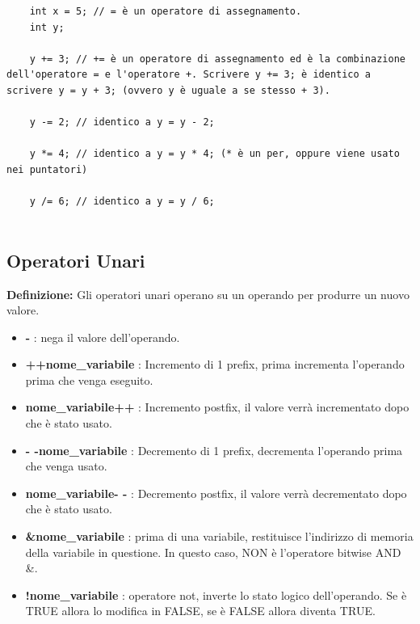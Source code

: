 \begin{lstlisting}
	int x = 5; // = è un operatore di assegnamento.
	int y;
	
	y += 3; // += è un operatore di assegnamento ed è la combinazione dell'operatore = e l'operatore +. Scrivere y += 3; è identico a scrivere y = y + 3; (ovvero y è uguale a se stesso + 3).
	
	y -= 2; // identico a y = y - 2;
	
	y *= 4; // identico a y = y * 4; (* è un per, oppure viene usato nei puntatori)
	
	y /= 6; // identico a y = y / 6;
	
\end{lstlisting}

\subsection{Operatori Unari}

\textsf{\small \textbf{Definizione: } Gli operatori unari operano su un operando per produrre un nuovo valore.} \\

\begin{itemize}
	\item \textsf{\small \textbf{-} : nega il valore dell'operando.}
	\item \textsf{\small \textbf{++nome\_variabile} : Incremento di 1 prefix, prima incrementa l'operando prima che venga eseguito.}
	\item \textsf{\small \textbf{nome\_variabile++} : Incremento postfix, il valore verrà incrementato dopo che è stato usato.}
	\item \textsf{\small \textbf{- -nome\_variabile} : Decremento di 1 prefix, decrementa l'operando prima che venga usato. }
	\item \textsf{\small \textbf{nome\_variabile- -} : Decremento postfix, il valore verrà decrementato dopo che è stato usato.}
	\item \textsf{\small \textbf{\&nome\_variabile} : prima di una variabile, restituisce l'indirizzo di memoria della variabile in questione. In questo caso, NON è l'operatore bitwise AND \&.}
	\item \textsf{\small \textbf{!nome\_variabile} : operatore not, inverte lo stato logico dell'operando. Se è TRUE allora lo modifica in FALSE, se è FALSE allora diventa TRUE.}
\end{itemize}

